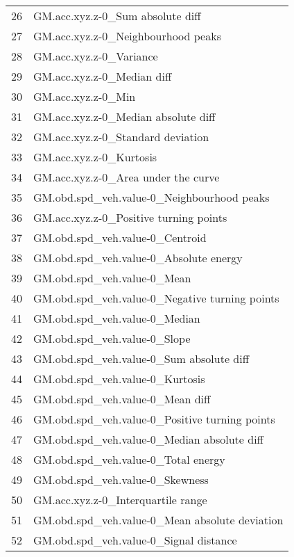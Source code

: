 \begin{tabular}{ll}
26 &                  GM.acc.xyz.z-0\_Sum absolute diff \\
27 &                GM.acc.xyz.z-0\_Neighbourhood peaks \\
28 &                           GM.acc.xyz.z-0\_Variance \\
29 &                        GM.acc.xyz.z-0\_Median diff \\
30 &                                GM.acc.xyz.z-0\_Min \\
31 &               GM.acc.xyz.z-0\_Median absolute diff \\
32 &                 GM.acc.xyz.z-0\_Standard deviation \\
33 &                           GM.acc.xyz.z-0\_Kurtosis \\
34 &               GM.acc.xyz.z-0\_Area under the curve \\
35 &        GM.obd.spd\_veh.value-0\_Neighbourhood peaks \\
36 &            GM.acc.xyz.z-0\_Positive turning points \\
37 &                   GM.obd.spd\_veh.value-0\_Centroid \\
38 &            GM.obd.spd\_veh.value-0\_Absolute energy \\
39 &                       GM.obd.spd\_veh.value-0\_Mean \\
40 &    GM.obd.spd\_veh.value-0\_Negative turning points \\
41 &                     GM.obd.spd\_veh.value-0\_Median \\
42 &                      GM.obd.spd\_veh.value-0\_Slope \\
43 &          GM.obd.spd\_veh.value-0\_Sum absolute diff \\
44 &                   GM.obd.spd\_veh.value-0\_Kurtosis \\
45 &                  GM.obd.spd\_veh.value-0\_Mean diff \\
46 &    GM.obd.spd\_veh.value-0\_Positive turning points \\
47 &       GM.obd.spd\_veh.value-0\_Median absolute diff \\
48 &               GM.obd.spd\_veh.value-0\_Total energy \\
49 &                   GM.obd.spd\_veh.value-0\_Skewness \\
50 &                GM.acc.xyz.z-0\_Interquartile range \\
51 &    GM.obd.spd\_veh.value-0\_Mean absolute deviation \\
52 &            GM.obd.spd\_veh.value-0\_Signal distance \\

\end{tabular}
